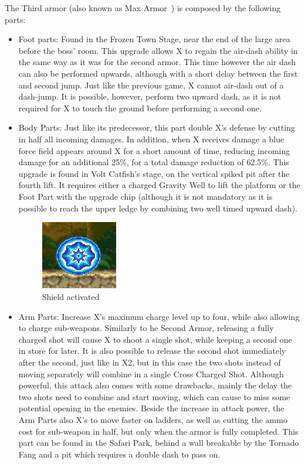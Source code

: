 The Third armor (also known as Max Armor~\cite{wiki:third_armor}) is composed by the following parts:
\begin{itemize}
	\item Foot parts: Found in 	the Frozen Town Stage, near the end of the large area before the boss' room. This upgrade allows X to regain the air-dash ability in the same way as it was for the second armor. This time however the air dash can also be performed upwards, although with a short delay between the first and second jump. Just like the previous game, X cannot air-dash out of a dash-jump. It is possible, however, perform two upward dash, as it is not required for X to touch the ground before performing a second one.
	
	
	\item Body Parts: Just like its predecessor, this part double X's defense by cutting in half all incoming damages. In addition, when X receives damage a blue force field appears around X for a short amount of time, reducing incoming damage for an additional 25\%, for a total damage reduction of 62.5\%. This upgrade is found in Volt Catfish's stage, on the vertical spiked pit after the fourth lift. It requires either a charged Gravity Well to lift the platform or the Foot Part with the upgrade chip (although it is not mandatory as it is possible to reach the upper ledge by combining two well timed upward dash).
	
	\begin{figure}[htp]
		\centering
		\includegraphics[height=3cm]{figures/X3/weapons/Armor_shield.png}
		\caption{Shield activated}
	\end{figure}
	
	\item Arm Parts: Increase X's maximum charge level up to four, while also allowing to charge sub-weapons. Similarly to he Second Armor, releasing a fully charged shot will cause X to shoot a single shot, while keeping a second one in store for later. It is also possible to release the second shot immediately after the second, just like in X2, but in this case the two shots instead of moving separately will combine in a single Cross Charged Shot. Although powerful, this attack also comes with some drawbacks, mainly the delay the two shots need to combine and start moving, which can cause to miss some potential opening in the enemies. 
	Beside the increase in attack power, the Arm Parts also X's to move faster on ladders, as well as cutting the ammo cost for sub-weapon in half, but only when the armor is fully completed. This part can be found in the Safari Park, behind a wall breakable by the Tornado Fang and a pit which requires a double dash to pass on.
		

\end{itemize}
